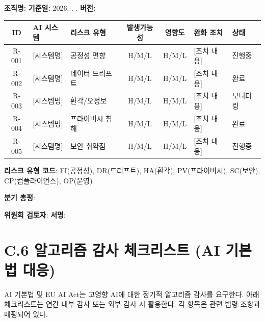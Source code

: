 \begin{tcolorbox}[colback=white, colframe=red!60, title={[Template C.5] AI 리스크 등록부 (분기별 갱신)}]
\textbf{조직명:} \underline{\hspace{3cm}} \quad \textbf{기준일:} 2026. \hspace{0.3cm} . \hspace{0.3cm} . \quad \textbf{버전:} \underline{\hspace{1cm}}

\begin{center}
\begin{tabularx}{\textwidth}{|c|p{2cm}|p{1.8cm}|c|c|p{2.5cm}|p{1.5cm}|}
\hline
\textbf{ID} & \textbf{AI 시스템} & \textbf{리스크 유형} & \textbf{발생가능성} & \textbf{영향도} & \textbf{완화 조치} & \textbf{상태} \\ \hline
R-001 & [시스템명] & 공정성 편향 & H/M/L & H/M/L & [조치 내용] & 진행중 \\ \hline
R-002 & [시스템명] & 데이터 드리프트 & H/M/L & H/M/L & [조치 내용] & 완료 \\ \hline
R-003 & [시스템명] & 환각/오정보 & H/M/L & H/M/L & [조치 내용] & 모니터링 \\ \hline
R-004 & [시스템명] & 프라이버시 침해 & H/M/L & H/M/L & [조치 내용] & 완료 \\ \hline
R-005 & [시스템명] & 보안 취약점 & H/M/L & H/M/L & [조치 내용] & 진행중 \\ \hline
\end{tabularx}
\end{center}

\textbf{리스크 유형 코드}: FI(공정성), DR(드리프트), HA(환각), PV(프라이버시), SC(보안), CP(컴플라이언스), OP(운영)

\textbf{분기 총평}: \underline{\hspace{10cm}}

\textbf{위원회 검토자}: \underline{\hspace{3cm}} \quad \textbf{서명}: \underline{\hspace{2cm}}
\end{tcolorbox}

\section*{C.6 알고리즘 감사 체크리스트 (AI 기본법 대응)}

AI 기본법 및 EU AI Act는 고영향 AI에 대한 정기적 알고리즘 감사를 요구한다. 아래 체크리스트는 연간 내부 감사 또는 외부 감사 시 활용한다. 각 항목은 관련 법령 조항과 매핑되어 있다.

